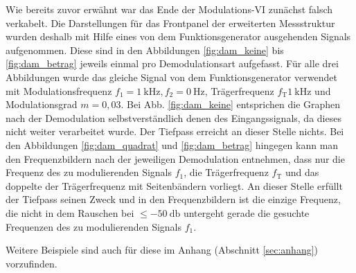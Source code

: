 		Wie bereits zuvor erwähnt war das Ende der Modulations-VI zunächst falsch verkabelt.
		Die Darstellungen für das Frontpanel der erweiterten Messstruktur wurden deshalb mit Hilfe eines von dem Funktionsgenerator ausgehenden Signals aufgenommen.
		Diese sind in den Abbildungen \ref{fig:dam_keine} bis \ref{fig:dam_betrag} jeweils einmal pro Demodulationsart aufgefasst.
		Für alle drei Abbildungen wurde das gleiche Signal von dem Funktionsgenerator verwendet mit Modulationsfrequenz $f_1= \SI{1}{\kilo\hertz}, f_2 = \SI{0}{\hertz}$, Trägerfrequenz $f_\text{T}\SI{1}{\kilo\hertz}$ und Modulationsgrad $m = 0,03$.
		Bei Abb. \ref{fig:dam_keine} entsprichen die Graphen nach der Demodulation selbstverständlich denen des Eingangssignals, da dieses nicht weiter verarbeitet wurde.
		Der Tiefpass erreicht an dieser Stelle nichts.
		Bei den Abbildungen \ref{fig:dam_quadrat} und \ref{fig:dam_betrag} hingegen kann man den Frequenzbildern nach der jeweiligen Demodulation entnehmen, dass nur die Frequenz des zu modulierenden Signals $f_1$, die Trägerfrequenz $f_\text{T}$ und das doppelte der Trägerfrequenz mit Seitenbändern vorliegt.
		An dieser Stelle erfüllt der Tiefpass seinen Zweck und in den Frequenzbildern ist die einzige Frequenz, die nicht in dem Rauschen bei $\leq \SI{-50}{\decibel}$ untergeht gerade die gesuchte Frequenzen des zu modulierenden Signals $f_1$.
		
		Weitere Beispiele sind auch für diese im Anhang (Abschnitt \ref{sec:anhang}) vorzufinden.
		
